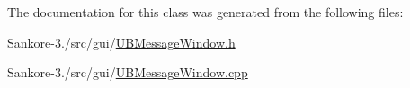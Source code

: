 The documentation for this class was generated from the following files\-:\begin{DoxyCompactItemize}
\item 
Sankore-\/3./src/gui/\hyperlink{_u_b_message_window_8h}{U\-B\-Message\-Window.\-h}\item 
Sankore-\/3./src/gui/\hyperlink{_u_b_message_window_8cpp}{U\-B\-Message\-Window.\-cpp}\end{DoxyCompactItemize}
